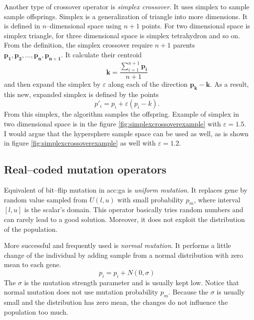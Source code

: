 Another type of crossover operator is \emph{simplex crossover}. It uses simplex to sample sample offsprings. Simplex is a generalization of triangle into more dimensions. It is defined in $n$--dimensional space using $n+1$ points. For two dimensional space is simplex triangle, for three dimensional space is simplex tetrahydron and so on. From the definition, the simplex crossover require $n+1$ parents $\mathbf{p_1}, \mathbf{p_2}, \dots, \mathbf{p_n}, \mathbf{p_{n+1}}$. It calculate their centroid
$$
\mathbf{k}=\frac{\sum_{i=1}^{n+1} \mathbf{p_i}}{n+1}
$$
and then expand the simplex by $\varepsilon$ along each of the direction $\mathbf{p_k} - \mathbf{k}$. As a result, this new, expanded simplex is defined by the points
\boldmath
$$
p'_i = p_i + \varepsilon\left( p_i - k \right).
$$
\unboldmath
From this simplex, the algorithm samples the offspring. Example of simplex in two dimensional space is in the figure \ref{fig:simplexcrossoverexample} with $\varepsilon=1.5$.
I would argue that the hypersphere sample space can be used as well, as is shown in figure \ref{fig:simplexcrossoverexample} as well with $\varepsilon=1.2$.

\subsection{Real--coded mutation operators}

Equivalent of bit--flip mutation in \acrshort{acc:ga} is \emph{uniform mutation}. It replaces gene by random value sampled from $U(l,u)$ with small probability $p_m$, where interval $\left[l,u\right]$ is the scalar's domain. This operator basically tries random numbers and can rarely lead to a good solution. Moreover, it does not exploit the distribution of the population.

More successful and frequently used is \emph{normal mutation}. It performs a little change of the individual by adding sample from a normal distribution with zero mean to each gene.
$$
p_i = p_i + N(0,\sigma)
$$
The $\sigma$ is the mutation strength parameter and is usually kept low. Notice that normal mutation does not use mutation probability $p_m$. Because the $\sigma$ is usually small and the distribution has zero mean, the changes do not influence the population too much.

